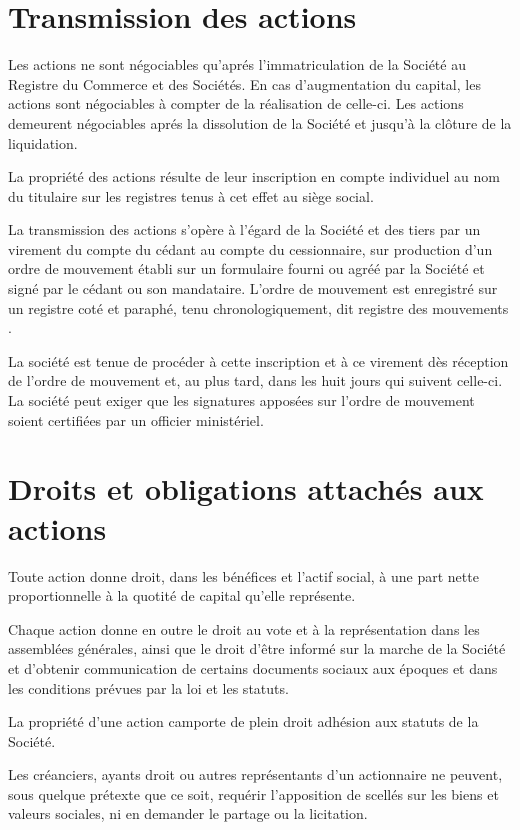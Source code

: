 \documentclass[a4paper,12pt]{report}
\begin{document}
\section{Transmission des actions}
Les actions ne sont négociables qu'aprés l'immatriculation de la Société au Registre du Commerce et des Sociétés. 
En cas d'augmentation du capital, les actions sont négociables à compter de la réalisation de celle-ci. 
Les actions demeurent négociables aprés la dissolution de la Société et jusqu'à la clôture de la liquidation.

La propriété des actions résulte de leur inscription en compte individuel au nom du titulaire sur les registres tenus à cet effet au siège social.

La transmission des actions s'opère à l'égard de la Société et des tiers par un virement du compte du cédant au compte du cessionnaire, 
sur production d'un ordre de mouvement établi sur un formulaire fourni ou agréé par la Société et signé par le cédant ou son mandataire. 
L'ordre de mouvement est enregistré sur un registre coté et paraphé, tenu chronologiquement, dit \og registre des mouvements \fg{}.

La société est tenue de procéder à cette inscription et à ce virement dès réception de l'ordre de mouvement et, au plus tard, dans les huit jours qui suivent celle-ci. 
La société peut exiger que les signatures apposées sur l'ordre de mouvement soient certifiées par un officier ministériel.

\section{Droits et obligations attachés aux actions}
Toute action donne droit, dans les bénéfices et l'actif social, à une part nette proportionnelle à la quotité de capital qu'elle représente.

Chaque action donne en outre le droit au vote et à la représentation dans les assemblées générales, 
ainsi que le droit d'être informé sur la marche de la Société et d'obtenir communication de certains documents sociaux aux époques et dans les conditions prévues par la loi et les statuts.

La propriété d'une action camporte de plein droit adhésion aux statuts de la Société.

Les créanciers, ayants droit ou autres représentants d'un actionnaire ne peuvent, sous quelque prétexte que ce soit, 
requérir l'apposition de scellés sur les biens et valeurs sociales, ni en demander le partage ou la licitation.
\end{document}
